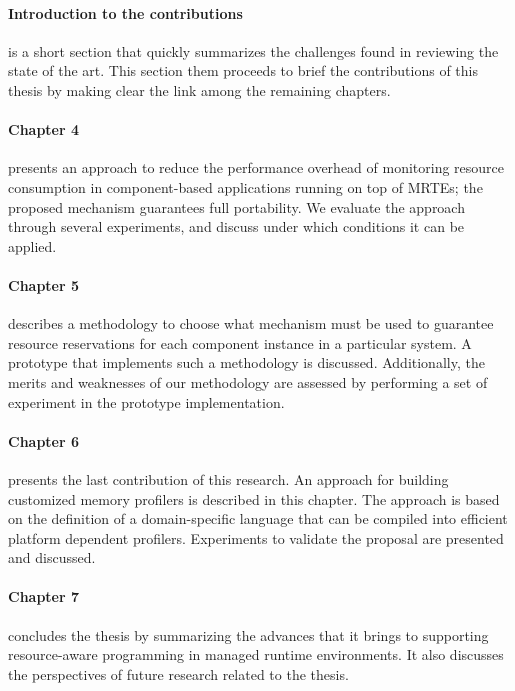 \paragraph{Introduction to the contributions} is a short section that quickly summarizes the challenges found in reviewing the state of the art. 
This section them proceeds to brief the contributions of this thesis by making clear the link among the remaining chapters.

\paragraph{Chapter 4} presents an approach to reduce the performance overhead of monitoring resource consumption in component-based applications running on top of MRTEs; the proposed mechanism guarantees full portability.
We evaluate the approach through several experiments, and discuss under which conditions it can be applied.

\paragraph{Chapter 5} describes a methodology to choose what mechanism must be used to guarantee resource reservations for each component instance in a particular system.
A prototype that implements such a methodology is discussed.
Additionally, the merits and weaknesses of our methodology are assessed by performing a set of experiment in the prototype implementation.

\paragraph{Chapter 6} presents the last contribution of this research.
An approach for building customized memory profilers is described in this chapter.
The approach is based on the definition of a domain-specific language that can be compiled into efficient platform dependent profilers.
Experiments to validate the proposal are presented and discussed.

\paragraph{Chapter 7} concludes the thesis by summarizing the advances that it brings to supporting resource-aware programming in managed runtime environments.
It also discusses the perspectives of future research related to the thesis.

